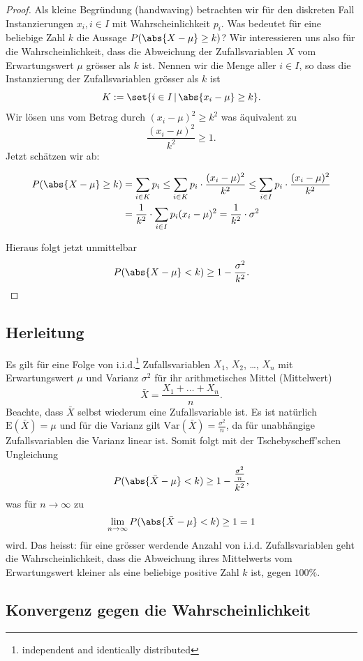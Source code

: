 \documentclass[%
11pt,%
twoside,%
titlepage,%
german,%
headsepline%
]{scrartcl}
\begin{document}
\begin{proof}
Als kleine Begründung (handwaving) betrachten wir für den diskreten Fall Instanzierungen $x_i, i\in I$ mit Wahrscheinlichkeit $p_i$. Was bedeutet für eine beliebige Zahl $k$ die Aussage $P(\abs{X-\mu}\geq k)$? Wir interessieren uns also für die Wahrscheinlichkeit, dass die Abweichung der Zufallsvariablen $X$ vom Erwartungswert $\mu$ grösser als $k$ ist. Nennen wir die Menge aller $i\in I$, so dass die Instanzierung der Zufallsvariablen grösser als $k$ ist
$$K:=\set{i\in I\,|\,\abs{x_i-\mu}\geq k}.$$
Wir lösen uns vom Betrag durch $(x_i-\mu)^2\geq k^2$ was äquivalent zu
$$\frac{(x_i-\mu)^2}{k^2}\geq 1.$$
Jetzt schätzen wir ab:

\begin{align*}
    P(\abs{X-\mu}\geq k) &= \sum_{i\in K}p_i\leq\sum_{i\in K}p_i\cdot\frac{(x_i-\mu)^2}{k^2}\leq\sum_{i\in I}p_i\cdot\frac{(x_i-\mu)^2}{k^2}\\
    &= \frac{1}{k^2}\cdot\sum_{i\in I}p_i(x_i-\mu)^2 = \frac{1}{k^2}\cdot\sigma^2
\end{align*}

Hieraus folgt jetzt unmittelbar
$$P(\abs{X-\mu}<k) \geq 1 - \frac{\sigma^2}{k^2}.$$
\end{proof}

\subsection{Herleitung}

Es gilt für eine Folge von i.i.d.\footnote{independent and identically distributed} Zufallsvariablen $X_1$, $X_2$, \dots, $X_n$ mit Erwartungswert $\mu$ und Varianz $\sigma^2$ für ihr arithmetisches Mittel (Mittelwert)
$$\bar{X}=\frac{X_1+\dots+X_n}{n}.$$
Beachte, dass $\bar{X}$ selbst wiederum eine Zufallsvariable ist. Es ist natürlich $\mathrm{E}(\bar{X})=\mu$ und für die Varianz gilt $\mathrm{Var}(\bar{X})=\frac{\sigma^2}{n}$, da für unabhängige Zufallsvariablen die Varianz linear ist. Somit folgt mit der Tschebyscheff'schen Ungleichung
$$P(\abs{\bar{X}-\mu}<k) \geq 1-\frac{\frac{\sigma^2}{n}}{k^2},$$
was für $n\to\infty$ zu
$$\lim_{n\to\infty}P(\abs{\bar{X}-\mu}<k) \geq 1=1$$
wird. Das heisst: für eine grösser werdende Anzahl von i.i.d. Zufallsvariablen geht die Wahrscheinlichkeit, dass die Abweichung ihres Mittelwerts vom Erwartungswert kleiner als eine beliebige positive Zahl $k$ ist, gegen $100\%$.

\subsection{Konvergenz gegen die Wahrscheinlichkeit}
\end{document}
